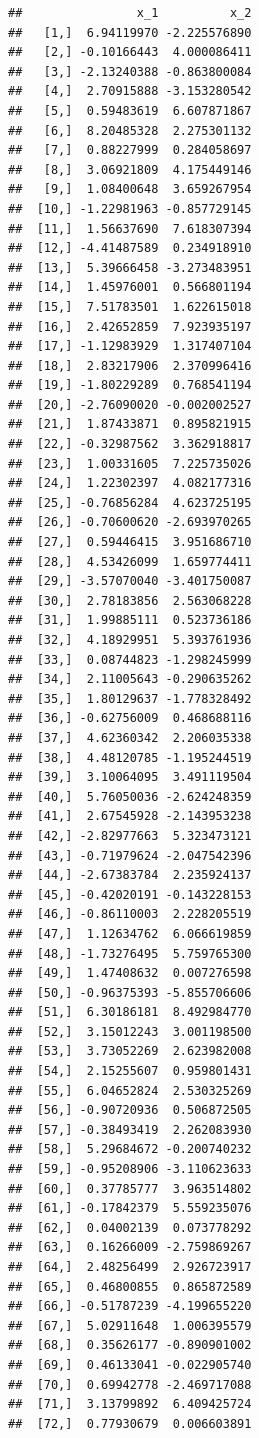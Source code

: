 \documentclass[]{book}
\begin{document}
\begin{verbatim}
##                x_1          x_2
##   [1,]  6.94119970 -2.225576890
##   [2,] -0.10166443  4.000086411
##   [3,] -2.13240388 -0.863800084
##   [4,]  2.70915888 -3.153280542
##   [5,]  0.59483619  6.607871867
##   [6,]  8.20485328  2.275301132
##   [7,]  0.88227999  0.284058697
##   [8,]  3.06921809  4.175449146
##   [9,]  1.08400648  3.659267954
##  [10,] -1.22981963 -0.857729145
##  [11,]  1.56637690  7.618307394
##  [12,] -4.41487589  0.234918910
##  [13,]  5.39666458 -3.273483951
##  [14,]  1.45976001  0.566801194
##  [15,]  7.51783501  1.622615018
##  [16,]  2.42652859  7.923935197
##  [17,] -1.12983929  1.317407104
##  [18,]  2.83217906  2.370996416
##  [19,] -1.80229289  0.768541194
##  [20,] -2.76090020 -0.002002527
##  [21,]  1.87433871  0.895821915
##  [22,] -0.32987562  3.362918817
##  [23,]  1.00331605  7.225735026
##  [24,]  1.22302397  4.082177316
##  [25,] -0.76856284  4.623725195
##  [26,] -0.70600620 -2.693970265
##  [27,]  0.59446415  3.951686710
##  [28,]  4.53426099  1.659774411
##  [29,] -3.57070040 -3.401750087
##  [30,]  2.78183856  2.563068228
##  [31,]  1.99885111  0.523736186
##  [32,]  4.18929951  5.393761936
##  [33,]  0.08744823 -1.298245999
##  [34,]  2.11005643 -0.290635262
##  [35,]  1.80129637 -1.778328492
##  [36,] -0.62756009  0.468688116
##  [37,]  4.62360342  2.206035338
##  [38,]  4.48120785 -1.195244519
##  [39,]  3.10064095  3.491119504
##  [40,]  5.76050036 -2.624248359
##  [41,]  2.67545928 -2.143953238
##  [42,] -2.82977663  5.323473121
##  [43,] -0.71979624 -2.047542396
##  [44,] -2.67383784  2.235924137
##  [45,] -0.42020191 -0.143228153
##  [46,] -0.86110003  2.228205519
##  [47,]  1.12634762  6.066619859
##  [48,] -1.73276495  5.759765300
##  [49,]  1.47408632  0.007276598
##  [50,] -0.96375393 -5.855706606
##  [51,]  6.30186181  8.492984770
##  [52,]  3.15012243  3.001198500
##  [53,]  3.73052269  2.623982008
##  [54,]  2.15255607  0.959801431
##  [55,]  6.04652824  2.530325269
##  [56,] -0.90720936  0.506872505
##  [57,] -0.38493419  2.262083930
##  [58,]  5.29684672 -0.200740232
##  [59,] -0.95208906 -3.110623633
##  [60,]  0.37785777  3.963514802
##  [61,] -0.17842379  5.559235076
##  [62,]  0.04002139  0.073778292
##  [63,]  0.16266009 -2.759869267
##  [64,]  2.48256499  2.926723917
##  [65,]  0.46800855  0.865872589
##  [66,] -0.51787239 -4.199655220
##  [67,]  5.02911648  1.006395579
##  [68,]  0.35626177 -0.890901002
##  [69,]  0.46133041 -0.022905740
##  [70,]  0.69942778 -2.469717088
##  [71,]  3.13799892  6.409425724
##  [72,]  0.77930679  0.006603891

\end{verbatim}
\end{document}
